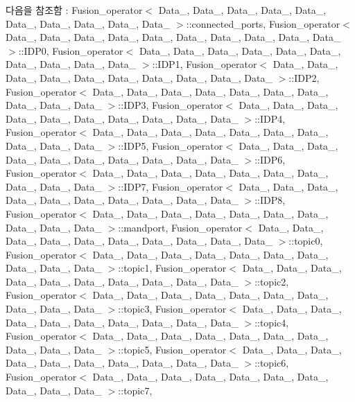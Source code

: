 다음을 참조함 \+:  Fusion\+\_\+operator$<$ Data\+\_, Data\+\_, Data\+\_, Data\+\_, Data\+\_, Data\+\_, Data\+\_, Data\+\_, Data\+\_, Data\+\_ $>$\+::connected\+\_\+ports, Fusion\+\_\+operator$<$ Data\+\_, Data\+\_, Data\+\_, Data\+\_, Data\+\_, Data\+\_, Data\+\_, Data\+\_, Data\+\_, Data\+\_ $>$\+::\+I\+D\+P0, Fusion\+\_\+operator$<$ Data\+\_, Data\+\_, Data\+\_, Data\+\_, Data\+\_, Data\+\_, Data\+\_, Data\+\_, Data\+\_, Data\+\_ $>$\+::\+I\+D\+P1, Fusion\+\_\+operator$<$ Data\+\_, Data\+\_, Data\+\_, Data\+\_, Data\+\_, Data\+\_, Data\+\_, Data\+\_, Data\+\_, Data\+\_ $>$\+::\+I\+D\+P2, Fusion\+\_\+operator$<$ Data\+\_, Data\+\_, Data\+\_, Data\+\_, Data\+\_, Data\+\_, Data\+\_, Data\+\_, Data\+\_, Data\+\_ $>$\+::\+I\+D\+P3, Fusion\+\_\+operator$<$ Data\+\_, Data\+\_, Data\+\_, Data\+\_, Data\+\_, Data\+\_, Data\+\_, Data\+\_, Data\+\_, Data\+\_ $>$\+::\+I\+D\+P4, Fusion\+\_\+operator$<$ Data\+\_, Data\+\_, Data\+\_, Data\+\_, Data\+\_, Data\+\_, Data\+\_, Data\+\_, Data\+\_, Data\+\_ $>$\+::\+I\+D\+P5, Fusion\+\_\+operator$<$ Data\+\_, Data\+\_, Data\+\_, Data\+\_, Data\+\_, Data\+\_, Data\+\_, Data\+\_, Data\+\_, Data\+\_ $>$\+::\+I\+D\+P6, Fusion\+\_\+operator$<$ Data\+\_, Data\+\_, Data\+\_, Data\+\_, Data\+\_, Data\+\_, Data\+\_, Data\+\_, Data\+\_, Data\+\_ $>$\+::\+I\+D\+P7, Fusion\+\_\+operator$<$ Data\+\_, Data\+\_, Data\+\_, Data\+\_, Data\+\_, Data\+\_, Data\+\_, Data\+\_, Data\+\_, Data\+\_ $>$\+::\+I\+D\+P8, Fusion\+\_\+operator$<$ Data\+\_, Data\+\_, Data\+\_, Data\+\_, Data\+\_, Data\+\_, Data\+\_, Data\+\_, Data\+\_, Data\+\_ $>$\+::mandport, Fusion\+\_\+operator$<$ Data\+\_, Data\+\_, Data\+\_, Data\+\_, Data\+\_, Data\+\_, Data\+\_, Data\+\_, Data\+\_, Data\+\_ $>$\+::topic0, Fusion\+\_\+operator$<$ Data\+\_, Data\+\_, Data\+\_, Data\+\_, Data\+\_, Data\+\_, Data\+\_, Data\+\_, Data\+\_, Data\+\_ $>$\+::topic1, Fusion\+\_\+operator$<$ Data\+\_, Data\+\_, Data\+\_, Data\+\_, Data\+\_, Data\+\_, Data\+\_, Data\+\_, Data\+\_, Data\+\_ $>$\+::topic2, Fusion\+\_\+operator$<$ Data\+\_, Data\+\_, Data\+\_, Data\+\_, Data\+\_, Data\+\_, Data\+\_, Data\+\_, Data\+\_, Data\+\_ $>$\+::topic3, Fusion\+\_\+operator$<$ Data\+\_, Data\+\_, Data\+\_, Data\+\_, Data\+\_, Data\+\_, Data\+\_, Data\+\_, Data\+\_, Data\+\_ $>$\+::topic4, Fusion\+\_\+operator$<$ Data\+\_, Data\+\_, Data\+\_, Data\+\_, Data\+\_, Data\+\_, Data\+\_, Data\+\_, Data\+\_, Data\+\_ $>$\+::topic5, Fusion\+\_\+operator$<$ Data\+\_, Data\+\_, Data\+\_, Data\+\_, Data\+\_, Data\+\_, Data\+\_, Data\+\_, Data\+\_, Data\+\_ $>$\+::topic6, Fusion\+\_\+operator$<$ Data\+\_, Data\+\_, Data\+\_, Data\+\_, Data\+\_, Data\+\_, Data\+\_, Data\+\_, Data\+\_, Data\+\_ $>$\+::topic7, 